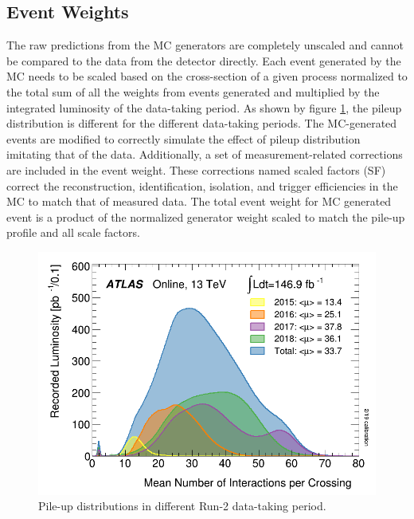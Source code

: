 \subsection{Event Weights}
\label{subsec:EventWt}

The raw predictions from the MC generators are completely unscaled and cannot be compared to the data from the detector directly. Each event generated by the MC needs to be scaled based on the cross-section of a given process normalized to the total sum of all the weights from events generated and multiplied by the integrated luminosity of the data-taking period. As shown by figure \ref{fig:PileupDiffRuns}, the pileup distribution is different for the different data-taking periods. The MC-generated events are modified to correctly simulate the effect of pileup distribution imitating that of the data. Additionally, a set of measurement-related corrections are included in the event weight. These corrections named scaled factors (SF) correct the reconstruction, identification, isolation, and trigger efficiencies in the MC to match that of measured data. The total event weight for MC generated event is a product of the normalized generator weight scaled to match the pile-up profile and all scale factors.

\begin{figure}
\centering
\includegraphics[width=.8\linewidth]{figures/AnalysisOverview/mu_ProfileRun2.pdf}
\caption{Pile-up distributions in different Run-2 data-taking period.\label{fig:PileupDiffRuns} \cite{ATLASRun2DataTaking}}
\end{figure}


